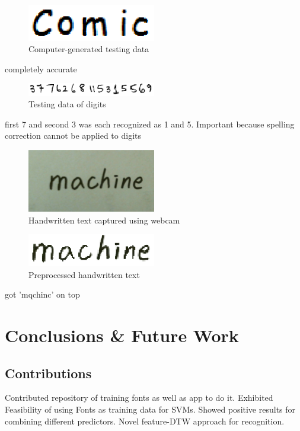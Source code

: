 \documentclass[12pt]{article}
\begin{document}
	\begin{figure}[htbp!]
	\centering
	\includegraphics[width=0.5\textwidth]{comic_comp.eps}
	\caption{Computer-generated testing data}
	\label{figure:comic_comp}
	\end{figure}
	completely accurate
	
	\begin{figure}[htbp!]
	\centering
	\includegraphics[width=0.5\textwidth]{number.eps}
	\caption{Testing data of digits}
	\label{figure:number}
	\end{figure}
	first 7 and second 3 was each recognized as 1 and 5.
	Important because spelling correction cannot be applied to digits
	
	
	\begin{figure}[htbp!]
	\centering
	\includegraphics[width=0.5\textwidth]{machine_camb.eps}
	\caption{Handwritten text captured using webcam}
	\label{figure:machine_camb}
	\end{figure}
	
	\begin{figure}[htbp!]
	\centering
	\includegraphics[width=0.5\textwidth]{machine_cam.eps}
	\caption{Preprocessed handwritten text}
	\label{figure:machine_cam}
	\end{figure}
	got 'mqchinc' on top
	
\section{Conclusions \& Future Work}
\label{section:conclusion}
	\subsection{Contributions}
	Contributed repository of training fonts as well as app to do it.
	Exhibited Feasibility of using Fonts as training data for SVMs.
	Showed positive results for combining different predictors.
	Novel feature-DTW approach for recognition.
\end{document}
